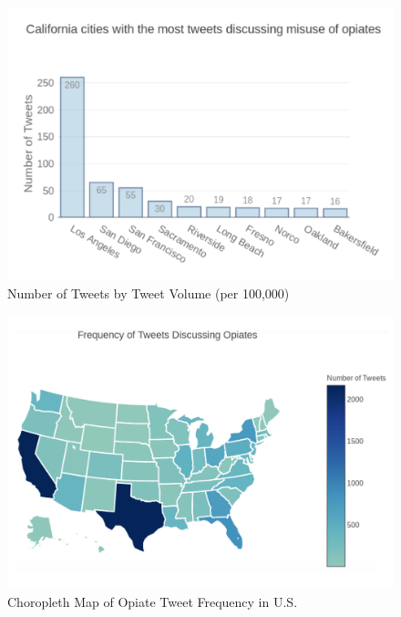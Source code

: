 \documentclass[sigconf]{acmart}
\begin{document}
\begin{figure}[!ht]
  \centering\includegraphics[width=\columnwidth]{images/Figure2.pdf}
  \caption{Number of Tweets by Tweet Volume (per 100,000)}
  \label{f:Figure2}
\end{figure}

\begin{figure}[!ht]
  \centering\includegraphics[width=\columnwidth]{images/Figure3.pdf}
  \caption{Choropleth Map of Opiate Tweet Frequency in U.S.}
  \label{f:Figure3}
\end{figure}
\end{document}
